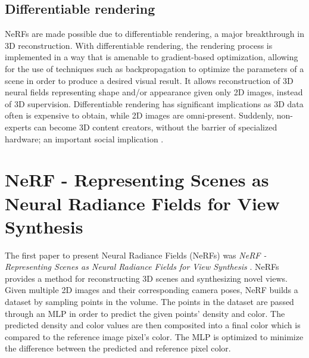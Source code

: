 \subsection{Differentiable rendering} %
NeRFs are made possible due to differentiable rendering, a major breakthrough in 3D reconstruction. With differentiable rendering, the rendering process is implemented in a way that is amenable to gradient-based optimization, allowing for the use of techniques such as backpropagation to optimize the parameters of a scene in order to produce a desired visual result. It allows reconstruction of 3D neural fields representing shape and/or appearance given only 2D images, instead of 3D supervision. Differentiable rendering has significant implications as 3D data often is expensive to obtain, while 2D images are omni-present. Suddenly, non-experts can become 3D content creators, without the barrier of specialized hardware; an important social implication \cite{xie_neural_2022}.




\section{NeRF - Representing Scenes as Neural Radiance Fields for View Synthesis}
The first paper to present Neural Radiance Fields (NeRFs) was \textit{NeRF - Representing Scenes as Neural Radiance Fields for View Synthesis} \cite{mildenhall_nerf_2020}. NeRFs provides a method for reconstructing 3D scenes and synthesizing novel views. Given multiple 2D images and their corresponding camera poses, NeRF builds a dataset by sampling points in the volume. The points in the dataset are passed through an MLP in order to predict the given points' density and color. The predicted density and color values are then composited into a final color which is compared to the reference image pixel's color. The MLP is optimized to minimize the difference between the predicted and reference pixel color.

